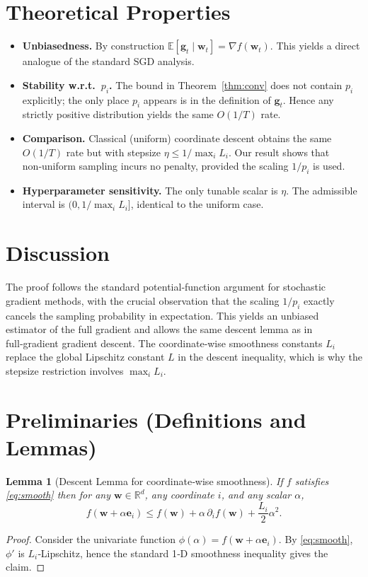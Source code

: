 \documentclass{article}
\newtheorem{lemma}{Lemma}
\newcommand{\E}{\mathbb{E}}
\newcommand{\R}{\mathbb{R}}
\newcommand{\e}{\mathbf{e}}
\begin{document}
\section*{Theoretical Properties}
\begin{itemize}[leftmargin=*]
\item \textbf{Unbiasedness.} By construction $\E[\mathbf g_t\mid\mathbf w_t]=\nabla f(\mathbf w_t)$. This yields a direct analogue of the standard SGD analysis.
\item \textbf{Stability w.r.t.\ $p_i$.} The bound in Theorem~\ref{thm:conv} does not contain $p_i$ explicitly; the only place $p_i$ appears is in the definition of $\mathbf g_t$. Hence any strictly positive distribution yields the same $O(1/T)$ rate.
\item \textbf{Comparison.} Classical (uniform) coordinate descent obtains the same $O(1/T)$ rate but with stepsize $\eta\le 1/\max_i L_i$. Our result shows that non‑uniform sampling incurs no penalty, provided the scaling $1/p_i$ is used.
\item \textbf{Hyperparameter sensitivity.} The only tunable scalar is $\eta$. The admissible interval is $ (0,1/\max_i L_i]$, identical to the uniform case.
\end{itemize}

\section*{Discussion}
The proof follows the standard potential‑function argument for stochastic gradient methods, with the crucial observation that the scaling $1/p_i$ exactly cancels the sampling probability in expectation. This yields an unbiased estimator of the full gradient and allows the same descent lemma as in full‑gradient gradient descent. The coordinate‑wise smoothness constants $L_i$ replace the global Lipschitz constant $L$ in the descent inequality, which is why the stepsize restriction involves $\max_i L_i$.

\newpage
\section*{Preliminaries (Definitions and Lemmas)}
\begin{lemma}[Descent Lemma for coordinate‑wise smoothness]
\label{lem:descent}
If $f$ satisfies \eqref{eq:smooth} then for any $\mathbf w\in\R^{d}$, any coordinate $i$, and any scalar $\alpha$,
\[
f(\mathbf w+\alpha \e_i)\le f(\mathbf w)+\alpha\,\partial_i f(\mathbf w)+\frac{L_i}{2}\alpha^{2}.
\]
\end{lemma}
\begin{proof}
Consider the univariate function $\phi(\alpha)=f(\mathbf w+\alpha\e_i)$. By \eqref{eq:smooth}, $\phi'$ is $L_i$‑Lipschitz, hence the standard 1‑D smoothness inequality gives the claim. \qedhere
\end{proof}
\end{document}
